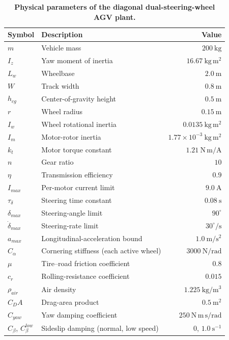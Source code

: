 \documentclass{ieeeaccess}
\begin{document}
\begin{table}[!t]
\centering
\caption{\textbf{Physical parameters of the diagonal dual-steering-wheel AGV plant.}}
\label{tab:agv_params}
\setlength{\tabcolsep}{4.5pt}
\setlength{\tabcolsep}{3pt}
\begin{tabular}{|l|l|r|}
\hline
Symbol & Description & Value \\
\hline
$m$ & Vehicle mass & $200~\mathrm{kg}$ \\
$I_z$ & Yaw moment of inertia & $16.67~\mathrm{kg\,m^2}$ \\
$L_w$ & Wheelbase & $2.0~\mathrm{m}$ \\
$W$ & Track width & $0.8~\mathrm{m}$ \\
$h_{cg}$ & Center-of-gravity height & $0.5~\mathrm{m}$ \\
\hline
$r$ & Wheel radius & $0.15~\mathrm{m}$ \\
$I_w$ & Wheel rotational inertia & $0.0135~\mathrm{kg\,m^2}$ \\
$I_m$ & Motor-rotor inertia & $1.77\times10^{-3}~\mathrm{kg\,m^2}$ \\
$k_t$ & Motor torque constant & $1.21~\mathrm{N\,m/A}$ \\
$n$ & Gear ratio & $10$ \\
$\eta$ & Transmission efficiency & $0.9$ \\
$I_{max}$ & Per-motor current limit & $9.0~\mathrm{A}$ \\
\hline
$\tau_\delta$ & Steering time constant & $0.08~\mathrm{s}$ \\
$\delta_{max}$ & Steering-angle limit & $90^{\circ}$ \\
$\dot\delta_{max}$ & Steering-rate limit & $30^{\circ}/\mathrm{s}$ \\
$a_{max}$ & Longitudinal-acceleration bound & $1.0~\mathrm{m/s^2}$ \\
\hline
$C_{\alpha}$ & Cornering stiffness (each active wheel) & $3000~\mathrm{N/rad}$ \\
$\mu$ & Tire--road friction coefficient & $0.8$ \\
$c_r$ & Rolling-resistance coefficient & $0.015$ \\
$\rho_{air}$ & Air density & $1.225~\mathrm{kg/m^3}$ \\
$C_DA$ & Drag-area product & $0.5~\mathrm{m^2}$ \\
$C_{yaw}$ & Yaw damping coefficient & $250~\mathrm{N\,m\,s/rad}$ \\
$C_{\beta}$, $C_{\beta}^{low}$ & Sideslip damping (normal, low speed) & $0$, $1.0~\mathrm{s^{-1}}$ \\
\hline
\end{tabular}
\end{table}
\end{document}
